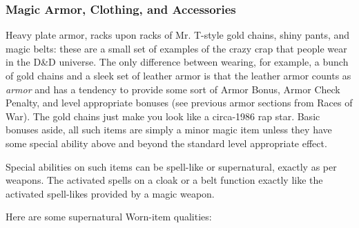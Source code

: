 \subsubsection{Magic Armor, Clothing, and Accessories}
\vspace*{-8pt}

Heavy plate armor, racks upon racks of Mr. T-style gold chains, shiny pants, and magic belts: these are a small set of examples of the crazy crap that people wear in the D\&D universe. The only difference between wearing, for example, a bunch of gold chains and a sleek set of leather armor is that the leather armor counts as \textit{armor} and has a tendency to provide some sort of Armor Bonus, Armor Check Penalty, and level appropriate bonuses (see previous armor sections from Races of War). The gold chains just make you look like a circa-1986 rap star. Basic bonuses aside, all such items are simply a minor magic item unless they have some special ability above and beyond the standard level appropriate effect.

Special abilities on such items can be spell-like or supernatural, exactly as per weapons. The activated spells on a cloak or a belt function exactly like the activated spell-likes provided by a magic weapon.

Here are some supernatural Worn-item qualities:

